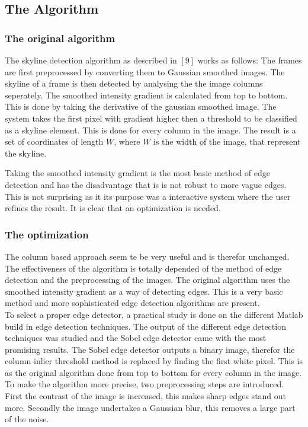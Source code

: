 \documentclass[10pt]{article}
\begin{document}

 \subsection{The Algorithm}
 \subsubsection{The original algorithm}
The skyline detection algorithm as described in $[9]$ works as follows:
The frames are first preprocessed by converting them to Gaussian smoothed images.
The skyline of a frame is then detected by analysing the the image columns
seperately.
The smoothed intensity gradient is calculated from top to bottom. This is done
by taking the derivative of the gaussian smoothed image.
The system takes the first pixel with gradient higher then a threshold to be
classified as a skyline element.  This is done for every column in the image.
The result is a set of coordinates of length $W$,
where $W$ is the width of the image, that represent the skyline.

Taking the smoothed intensity gradient is the most basic method of edge
detection and has the disadvantage that is is not robust to more vague
edges. This is not surprising as it its purpose was a interactive system where the
user refines the result. It is clear that an optimization is needed.

  \subsubsection{The optimization}
The column based approach seem te be very useful and is therefor unchanged. 
The effectiveness of the algorithm is totally depended of the method of edge
detection and the preprocessing of the images. 
The original algorithm uses the smoothed intensity gradient as a way of
detecting edges. This is a very basic method and more sophisticated edge
detection algorithms are present.\\
To select a proper edge detector, a practical study is done on the different
Matlab build in edge detection techniques. The output of the different edge
detection techniques was studied and the Sobel edge detector came with the most
promising results. The Sobel edge detector outputs a binary image, therefor the column inlier
threshold method is replaced by finding the first white pixel. This is as the
original algorithm done from top to bottom for every column in the image.
\\ 
To make the algorithm more precise, two preprocessing
steps are introduced. First the contrast of the image is increased, this makes
sharp edges stand out more.  Secondly the image undertakes a Gaussian blur,
this removes a large part of the noise.
\end{document}
